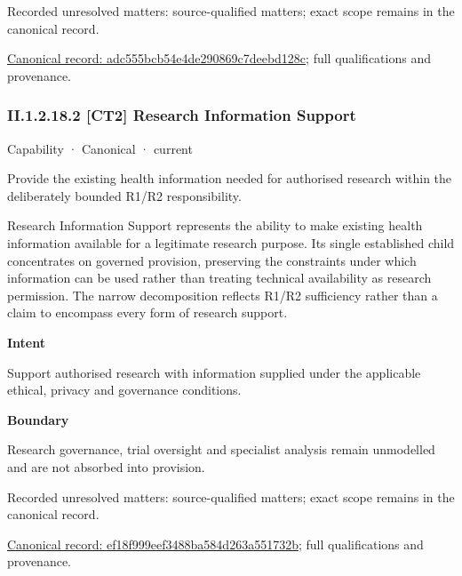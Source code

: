 {\small Recorded unresolved matters: source-qualified matters; exact scope remains in the canonical record.}\par
{\footnotesize \href{../../../../continuum/strategy/capability/adc555bcb54e4de290869c7deebd128c.md}{Canonical record: adc555bcb54e4de290869c7deebd128c}; full qualifications and provenance.}\par
\subsubsection*{II.1.2.18.2 [CT2] Research Information Support}
\label{navigation:II.1.2.18.2}

\label{element:ef18f999eef3488ba584d263a551732b}
{\small Capability · Canonical · current}\par

Provide the existing health information needed for authorised research within the deliberately bounded R1/R2 responsibility.



Research Information Support represents the ability to make existing health information available for a legitimate research purpose. Its single established child concentrates on governed provision, preserving the constraints under which information can be used rather than treating technical availability as research permission. The narrow decomposition reflects R1/R2 sufficiency rather than a claim to encompass every form of research support.



\textbf{Intent}



Support authorised research with information supplied under the applicable ethical, privacy and governance conditions.



\textbf{Boundary}



Research governance, trial oversight and specialist analysis remain unmodelled and are not absorbed into provision.


{\small Recorded unresolved matters: source-qualified matters; exact scope remains in the canonical record.}\par
{\footnotesize \href{../../../../continuum/strategy/capability/ef18f999eef3488ba584d263a551732b.md}{Canonical record: ef18f999eef3488ba584d263a551732b}; full qualifications and provenance.}\par
